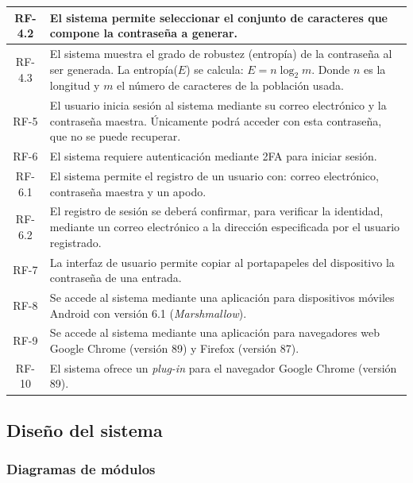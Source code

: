 \documentclass{article}
\begin{document}
\begin{table}[H]
\begin{tabular}{| c | p{30em} |}
       RF-4.2 & El sistema permite seleccionar el conjunto de caracteres que compone la contraseña a generar.\\ \hline
       RF-4.3 & El sistema muestra el grado de robustez (entropía) de la contraseña al ser generada. La entropía($E$) se calcula: $E=n\log_2m$. Donde $n$ es la longitud y $m$ el número de caracteres de la población usada.\\ \hline
       RF-5 & El usuario inicia sesión al sistema mediante su correo electrónico y la contraseña maestra. Únicamente podrá acceder con esta contraseña, que no se puede recuperar.\\ \hline
       RF-6 & El sistema requiere autenticación mediante 2FA para iniciar sesión. \\ \hline
       RF-6.1 & El sistema permite el registro de un usuario con: correo electrónico, contraseña maestra y un apodo.\\ \hline
       RF-6.2 & El registro de sesión se deberá confirmar, para verificar la identidad, mediante un correo electrónico a la dirección especificada por el usuario registrado. \\ \hline
       RF-7 & La interfaz de usuario permite copiar al portapapeles del dispositivo la contraseña de una entrada. \\ \hline
       RF-8 & Se accede al sistema mediante una aplicación para dispositivos móviles Android con versión 6.1 (\textit{Marshmallow}). \\ \hline
       RF-9 & Se accede al sistema mediante una aplicación para navegadores web Google Chrome (versión 89) y Firefox (versión 87). \\ \hline
       RF-10 & El sistema ofrece un \textit{plug-in} para el navegador Google Chrome (versión 89). \\ \hline
   \end{tabular}
\end{table}

\subsection{Diseño del sistema}

\subsubsection*{Diagramas de módulos}
\end{document}
